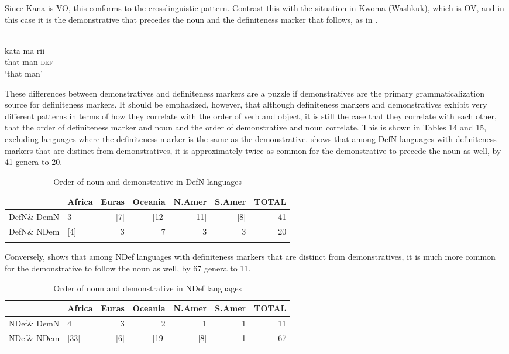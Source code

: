 \documentclass[output=paper]{langsci/langscibook}
\begin{document}
Since Kana is VO, this conforms to the crosslinguistic pattern. Contrast this with the situation in Kwoma (Washkuk), which is OV, and in this case it is the demonstrative that precedes the noun and the definiteness marker that follows, as in .

\ea\label{ex:dryer:}
\\
\gll   kata  ma  rii\\
       that  man  \textsc{def}\\
\glt   ‘that man’
\z

These differences between demonstratives and definiteness markers are a puzzle if demonstratives are the primary grammaticalization source for definiteness markers. It should be emphasized, however, that although definiteness markers and demonstratives exhibit very different patterns in terms of how they correlate with the order of verb and object, it is still the case that they correlate with each other, that the order of definiteness marker and noun and the order of demonstrative and noun correlate. This is shown in Tables 14 and 15, excluding languages where the definiteness marker is the same as the demonstrative.  shows that among DefN languages with definiteness markers that are distinct from demonstratives, it is approximately twice as common for the demonstrative to precede the noun as well, by 41 genera to 20.

\begin{table}
\begin{tabularx}{\textwidth}{Xlrrrrr}
\lsptoprule
& \bfseries Africa & \bfseries Euras & \bfseries Oceania & \bfseries N.Amer & \bfseries S.Amer & \bfseries TOTAL\\
\midrule
DefN\& DemN & 3 & [7] & [12] & [11] & [8] & 41\\
DefN\& NDem & [4] & 3 & 7 & 3 & 3 & 20\\
\lspbottomrule
\end{tabularx}
\caption{\label{tab:dryer:14}Order of noun and demonstrative in DefN languages}
\end{table}

Conversely,  shows that among NDef languages with definiteness markers that are distinct from demonstratives, it is much more common for the demonstrative to follow the noun as well, by 67 genera to 11.

\begin{table}
\begin{tabularx}{\textwidth}{Xlrrrrr}
\lsptoprule
& \bfseries Africa & \bfseries Euras & \bfseries Oceania & \bfseries N.Amer & \bfseries S.Amer & \bfseries TOTAL\\
\midrule
NDef\& DemN & 4 & 3 & 2 & 1 & 1 & 11\\
NDef\& NDem & [33] & [6] & [19] & [8] & 1 & 67\\
\lspbottomrule
\end{tabularx}
\caption{\label{tab:dryer:15}Order of noun and demonstrative in NDef languages}
\end{table}
\end{document}
